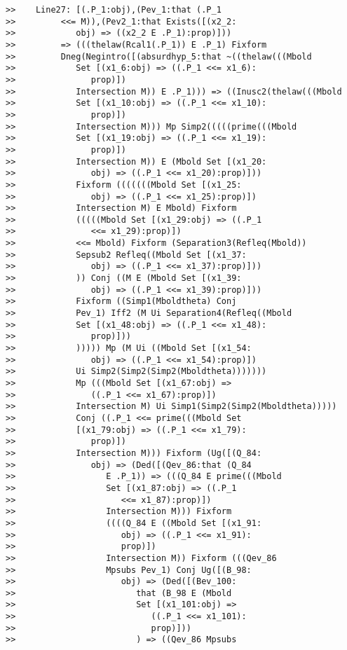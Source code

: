 \documentclass[12pt]{article}
\begin{document}
\begin{verbatim}
>>    Line27: [(.P_1:obj),(Pev_1:that (.P_1
>>         <<= M)),(Pev2_1:that Exists([(x2_2:
>>            obj) => ((x2_2 E .P_1):prop)]))
>>         => (((thelaw(Rcal1(.P_1)) E .P_1) Fixform
>>         Dneg(Negintro([(absurdhyp_5:that ~((thelaw(((Mbold
>>            Set [(x1_6:obj) => ((.P_1 <<= x1_6):
>>               prop)])
>>            Intersection M)) E .P_1))) => ((Inusc2(thelaw(((Mbold
>>            Set [(x1_10:obj) => ((.P_1 <<= x1_10):
>>               prop)])
>>            Intersection M))) Mp Simp2(((((prime(((Mbold
>>            Set [(x1_19:obj) => ((.P_1 <<= x1_19):
>>               prop)])
>>            Intersection M)) E (Mbold Set [(x1_20:
>>               obj) => ((.P_1 <<= x1_20):prop)]))
>>            Fixform (((((((Mbold Set [(x1_25:
>>               obj) => ((.P_1 <<= x1_25):prop)])
>>            Intersection M) E Mbold) Fixform
>>            (((((Mbold Set [(x1_29:obj) => ((.P_1
>>               <<= x1_29):prop)])
>>            <<= Mbold) Fixform (Separation3(Refleq(Mbold))
>>            Sepsub2 Refleq((Mbold Set [(x1_37:
>>               obj) => ((.P_1 <<= x1_37):prop)]))
>>            )) Conj ((M E (Mbold Set [(x1_39:
>>               obj) => ((.P_1 <<= x1_39):prop)]))
>>            Fixform ((Simp1(Mboldtheta) Conj
>>            Pev_1) Iff2 (M Ui Separation4(Refleq((Mbold
>>            Set [(x1_48:obj) => ((.P_1 <<= x1_48):
>>               prop)]))
>>            ))))) Mp (M Ui ((Mbold Set [(x1_54:
>>               obj) => ((.P_1 <<= x1_54):prop)])
>>            Ui Simp2(Simp2(Simp2(Mboldtheta)))))))
>>            Mp (((Mbold Set [(x1_67:obj) =>
>>               ((.P_1 <<= x1_67):prop)])
>>            Intersection M) Ui Simp1(Simp2(Simp2(Mboldtheta)))))
>>            Conj ((.P_1 <<= prime(((Mbold Set
>>            [(x1_79:obj) => ((.P_1 <<= x1_79):
>>               prop)])
>>            Intersection M))) Fixform (Ug([(Q_84:
>>               obj) => (Ded([(Qev_86:that (Q_84
>>                  E .P_1)) => (((Q_84 E prime(((Mbold
>>                  Set [(x1_87:obj) => ((.P_1
>>                     <<= x1_87):prop)])
>>                  Intersection M))) Fixform
>>                  ((((Q_84 E ((Mbold Set [(x1_91:
>>                     obj) => ((.P_1 <<= x1_91):
>>                     prop)])
>>                  Intersection M)) Fixform (((Qev_86
>>                  Mpsubs Pev_1) Conj Ug([(B_98:
>>                     obj) => (Ded([(Bev_100:
>>                        that (B_98 E (Mbold
>>                        Set [(x1_101:obj) =>
>>                           ((.P_1 <<= x1_101):
>>                           prop)]))
>>                        ) => ((Qev_86 Mpsubs

\end{verbatim}
\end{document}
